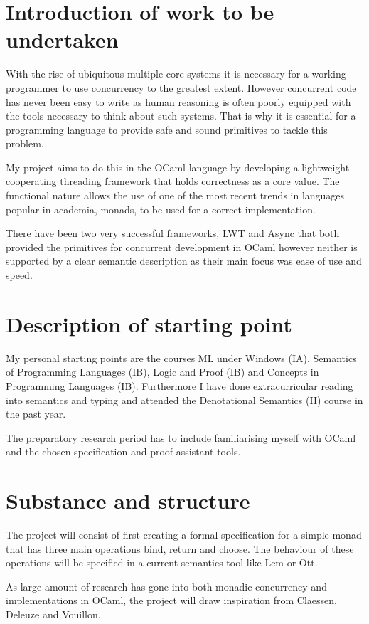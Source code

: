 

\section{Introduction of work to be undertaken}
With the rise of ubiquitous multiple core systems it is necessary for a working programmer to use concurrency to the greatest extent. However concurrent code has never been easy to write as human reasoning is often poorly equipped with the tools necessary to think about such systems. That is why it is essential for a programming language to provide safe and sound primitives to tackle this problem. 

My project aims to do this in the OCaml\cite{OCaml} language by developing a lightweight cooperating threading framework that holds correctness as a core value. The functional nature allows the use of one of the most recent trends in languages popular in academia, monads, to be used for a correct implementation. 

There have been two very successful frameworks, LWT\cite{LWT} and Async\cite{Async} that both provided the primitives for concurrent development in OCaml however neither is supported by a clear semantic description as their main focus was ease of use and speed. 
\section{Description of starting point}
My personal starting points are the courses ML under Windows (IA), Semantics of Programming Languages (IB), Logic and Proof (IB) and Concepts in Programming Languages (IB). Furthermore I have done extracurricular reading into semantics and typing and attended the Denotational Semantics (II) course in the past year.

The preparatory research period has to include familiarising myself with OCaml and the chosen specification and proof assistant tools.
\section{Substance and structure}
The project will consist of first creating a formal specification for a simple monad that has three main operations bind, return and choose. The behaviour of these operations will be specified in a current semantics tool like Lem\cite{Lem} or Ott\cite{Ott}. 

As large amount of research has gone into both monadic concurrency and implementations in OCaml, the project will draw inspiration from Claessen\cite{Claessen99functionalpearls}, Deleuze\cite{deleuzelight} and Vouillon\cite{vouillon2008lwt}.

